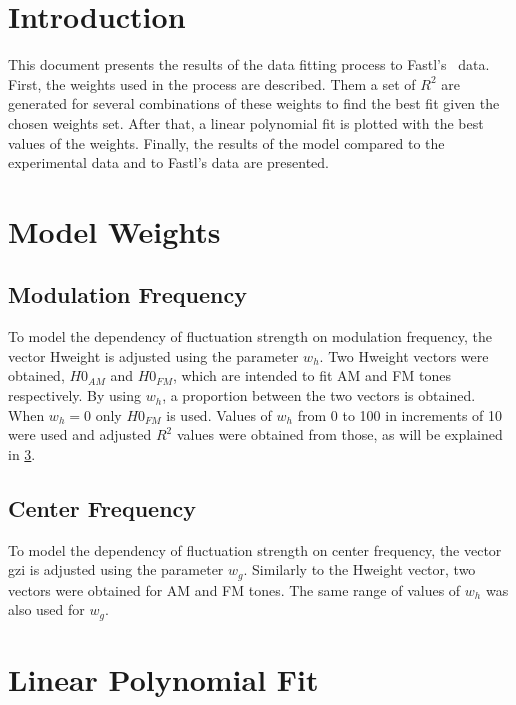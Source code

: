 \documentclass{article}
\begin{document}

\section{Introduction}
\label{sec:introduction}

This document presents the results of the data fitting process to
Fastl's~\cite{Fastl2007Psychoacoustics} data. First, the weights used in the
process are described. Them a set of $R^2$ are generated for several
combinations of these weights to find the best fit given the chosen weights set.
After that, a linear polynomial fit is plotted with the best values of the
weights. Finally, the results of the model compared to the experimental data and
to Fastl's data are presented.

\section{Model Weights}
\label{sec:model_weights}

\subsection{Modulation Frequency}
\label{sub:modulation_frequency}

To model the dependency of fluctuation strength on modulation frequency, the
vector Hweight is adjusted using the parameter $w_h$. Two Hweight vectors were
obtained, $H0_{AM}$ and $H0_{FM}$, which are intended to fit AM and FM tones
respectively. By using $w_h$, a proportion between the two vectors is obtained.
When $w_h=0$ only $H0_{FM}$ is used. Values of $w_h$ from 0 to 100 in
increments of 10 were used and adjusted $R^2$ values were obtained from those,
as will be explained in \cref{sec:linear_polynomial_fit}.

\subsection{Center Frequency}
\label{sub:center_frequency}

To model the dependency of fluctuation strength on center frequency, the vector
gzi is adjusted using the parameter $w_g$. Similarly to the Hweight vector, two
vectors were obtained for AM and FM tones. The same range of values of $w_h$ was
also used for $w_g$.

\section{Linear Polynomial Fit}
\label{sec:linear_polynomial_fit}
\end{document}
